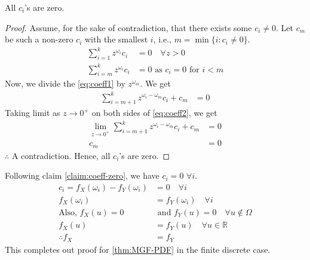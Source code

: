 \begin{claim}\label{claim:coeff-zero}
	All $c_i$'s are zero.
\end{claim}
\begin{proof}
	Assume, for the sake of contradiction, that there exists some $c_i \neq 0$. Let $c_m$ be such a non-zero $c_i$ with the smallest $i$, i.e., $m = \min\{i: c_i \neq 0\}$.
	\begin{align}
		\sum_{i=1}^k z^{\omega_i} c_i & = 0   \hspace{1em} \forall z > 0            \nonumber           \\
		\sum_{i=m}^k z^{\omega_i} c_i & = 0\textrm{ as } c_i = 0 \textrm{ for } i < m \label{eq:coeff1}
	\end{align}
	Now, we divide the \cref{eq:coeff1} by $z^{\omega_m}$. We get
	\begin{align}
		\sum_{i=m+1}^k z^{\omega_i - \omega_m} c_i + c_m & = 0\label{eq:coeff2}
	\end{align}
	Taking limit as $z \to 0^+$ on both sides of \cref{eq:coeff2}, we get
	\begin{align*}
		\lim_{z\to 0^+} \sum_{i=m+1}^k z^{\omega_i - \omega_m} c_i + c_m & = 0 \\
		c_m                                                              & = 0
	\end{align*}
	$\therefore$ A contradiction. Hence, all $c_i$'s are zero.
\end{proof}
Following claim \ref{claim:coeff-zero}, we have $c_i = 0$ $\forall i$.
\begin{align*}
	c_i = f_X(\omega_i) - f_Y(\omega_i) & = 0 \hspace{1em} \forall i                                   \\
	f_X(\omega_i)                       & = f_Y(\omega_i) \hspace{1em} \forall i                       \\
	\textrm{Also, }	f_X(u) = 0          & \textrm{ and } f_Y(u)=0 \hspace{1em} \forall u \notin \Omega \\
	f_X(u)                              & = f_Y(u) \hspace{1em}\forall u\in \mathbb{R}                 \\
	\therefore	f_X                      & = f_Y
\end{align*}
This completes out proof for \cref{thm:MGF-PDF} in the finite discrete case.
